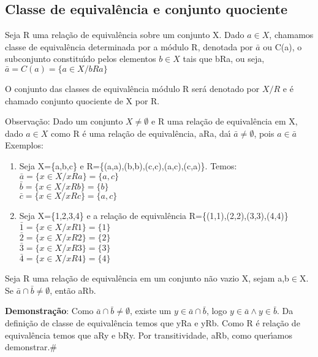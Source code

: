 \subsection{Classe de equival{\^e}ncia e conjunto quociente}
\begin{definicao} Seja R uma rela{\c c}{\~a}o de equival{\^e}ncia sobre um conjunto X. Dado $a\in X$, chamamos classe de equival{\^e}ncia determinada por a m{\'o}dulo R, denotada por $\bar{a}$ ou C(a), o subconjunto constitu{\'\i}do pelos elementos $b\in X$ tais que bRa, ou seja, $\bar{a}=C(a)=\{a\in X/ bRa\}$\end{definicao}

\begin{definicao}
O conjunto das classes de equival{\^e}ncia m{\'o}dulo R ser{\'a} denotado por $X/R$ e {\'e} chamado conjunto quociente de X por R.
\end{definicao}

Observa{\c c}{\~a}o: Dado um conjunto $X\neq\emptyset$ e R uma rela{\c c}{\~a}o de equival{\^e}ncia em X, dado $a\in X$ como R {\'e} uma rela{\c c}{\~a}o de equival{\^e}ncia, aRa, da{\'\i} $\bar{a}\neq\emptyset$, pois $a\in\bar{a}$\\

Exemplos:
\begin{enumerate}
\item Seja X=\{a,b,c\} e R=\{(a,a),(b,b),(c,c),(a,c),(c,a)\}. Temos:\\
$\bar{a}=\{x\in X/xRa\}=\{a,c\}$\\
$\bar{b}=\{x\in X/xRb\}=\{b\}$\\
$\bar{c}=\{x\in X/xRc\}=\{a,c\}$
\item Seja X=\{1,2,3,4\} e a rela{\c c}{\~a}o de equival{\^e}ncia R=\{(1,1),(2,2),(3,3),(4,4)\}\\
$\bar{1}=\{x\in X/xR1\}=\{1\}$\\
$\bar{2}=\{x\in X/xR2\}=\{2\}$\\
$\bar{3}=\{x\in X/xR3\}=\{3\}$\\
$\bar{4}=\{x\in X/xR4\}=\{4\}$
\end{enumerate}

\begin{proposicao} Seja R uma rela{\c c}{\~a}o de equival{\^e}ncia em um conjunto n{\~a}o vazio X, sejam a,b$\in$X. Se $\bar{a}\cap\bar{b}\neq\emptyset$, ent{\~a}o aRb.\end{proposicao}

\textbf{Demonstra{\c c}{\~a}o}: Como  $\bar{a}\cap\bar{b}\neq\emptyset$, existe um $y\in\bar{a}\cap\bar{b}$, logo $y\in\bar{a}\wedge y\in\bar{b}$. Da defini{\c c}{\~a}o de classe de equival{\^e}ncia temos que yRa e yRb. Como R {\'e} rela{\c c}{\~a}o de equival{\^e}ncia temos que aRy e bRy. Por transitividade, aRb, como quer{\'\i}amos demonstrar.\#

